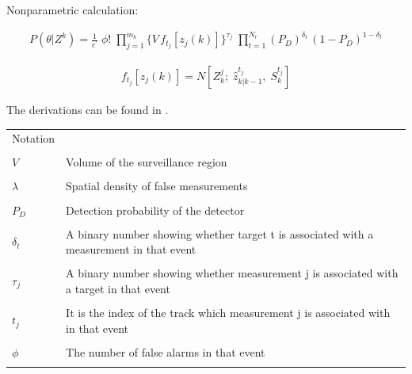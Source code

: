 \documentclass[peerreview]{IEEEtran}
\begin{document}
Nonparametric calculation:

\begin{equation}
\begin{aligned}
P(\theta|Z^k) = \frac{1}{c^{'}} \; \phi! \; \prod\limits_{j=1}^{m_k} \{ V \, f_{t_j}[z_j(k)] \} ^{\tau_j} \; \prod\limits_{t=1}^{N_r} (P_D)^{\delta_t} \, (1-P_D)^{1-\delta_t}
\end{aligned}
\end{equation}

\begin{equation}
\begin{aligned}
f_{t_j}[z_j(k)] = N[Z^j_k; \; \hat{z}^{t_j}_{k|k-1}, \; S^{t_j}_k]
\end{aligned}
\end{equation}

\vspace{5px}

The derivations can be found in \cite[p.317]{BYL95}.

\vspace{5px}

\begin{center}

\begin{tabularx}{0.4\textwidth }{@{}p{}X@{}}
\toprule
  Notation \\ \\
  $V$ & Volume of the surveillance region \\ \\
  $\lambda$ & Spatial density of false measurements \\ \\
  $P_D$ & Detection probability of the detector \\ \\
  $\delta_t$ & A binary number showing whether target t is associated with a measurement in that event\\ \\
  $\tau_j$ & A binary number showing whether measurement j is associated with a target in that event \\ \\
  $t_j$ & It is the index of the track which measurement j is associated with in that event \\ \\
  $\phi$ & The number of false alarms in that event\\ \\
  
 
\bottomrule
\end{tabularx}

\end{center}
\end{document}
